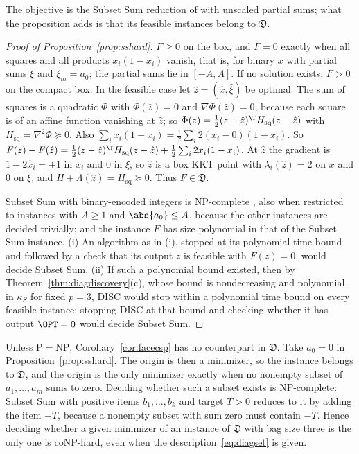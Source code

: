 The objective is the Subset Sum reduction of
\cite[Remark~2]{DelPiaKhajavirad2026} with unscaled partial sums; what the
proposition adds is that its feasible instances belong to $\mathfrak D$.

\begin{proof}[Proof of Proposition~\ref{prop:sshard}]
$F\ge0$ on the box, and $F=0$ exactly when all squares and all products
$x_i(1-x_i)$ vanish, that is, for binary $x$ with partial sums $\xi$ and
$\xi_m=a_0$; the partial sums lie in $[-A,A]$. If no solution exists, $F>0$
on the compact box. In the feasible case let $\hat z=(\hat x,\hat\xi)$ be
optimal. The sum of squares is a quadratic $\Phi$ with $\Phi(\hat z)=0$ and
$\nabla\Phi(\hat z)=0$, because each square is of an affine function
vanishing at $\hat z$; so $\Phi(z)=\frac12(z-\hat z)^{\T}H_{\mathrm{sq}}
(z-\hat z)$ with $H_{\mathrm{sq}}=\nabla^2\Phi\succeq0$. Also
$\sum_ix_i(1-x_i)=\frac12\sum_i2(x_i-0)(1-x_i)$. So
$F(z)-F(\hat z)=\frac12(z-\hat z)^{\T}H_{\mathrm{sq}}(z-\hat z)
+\frac12\sum_i2x_i(1-x_i)$. At $\hat z$ the gradient is $1-2\hat x_i=\pm1$ in
$x_i$ and $0$ in $\xi$, so $\hat z$ is a box KKT point with
$\lambda_i(\hat z)=2$ on $x$ and $0$ on $\xi$, and
$H+\Lambda(\hat z)=H_{\mathrm{sq}}\succeq0$. Thus $F\in\mathfrak D$.

Subset Sum with binary-encoded integers is NP-complete
\cite{GareyJohnson1979}, also when restricted to instances with $A\ge1$ and
$\abs{a_0}\le A$, because the other instances are decided trivially; and the
instance $F$ has size polynomial in that of the Subset Sum instance. (i) An
algorithm as in (i), stopped at its polynomial time bound and followed by a
check that its output $z$ is feasible with $F(z)=0$, would decide Subset Sum. (ii) If such a polynomial
bound existed, then by Theorem~\ref{thm:diagdiscovery}(c), whose bound is
nondecreasing and polynomial in $\kappa_S$ for fixed $p=3$, DISC would stop
within a polynomial time bound on every feasible instance; stopping DISC at
that bound and checking whether it has output $\OPT=0$ would decide Subset Sum.
\end{proof}

Unless $\mathrm P=\mathrm{NP}$, Corollary~\ref{cor:facecsp} has no
counterpart in $\mathfrak D$. Take $a_0=0$ in Proposition~\ref{prop:sshard}. The origin is then a minimizer, so
the instance belongs to $\mathfrak D$, and the origin is the only minimizer
exactly when no nonempty subset of $a_1,\ldots,a_m$ sums to zero. Deciding
whether such a subset exists is NP-complete: Subset Sum with positive items
$b_1,\ldots,b_k$ and target $T>0$ reduces to it by adding the item $-T$,
because a nonempty subset with sum zero must contain $-T$. Hence deciding
whether a given minimizer of an instance of $\mathfrak D$ with bag size three
is the only one is coNP-hard, even when the description~\eqref{eq:diagset} is
given.
